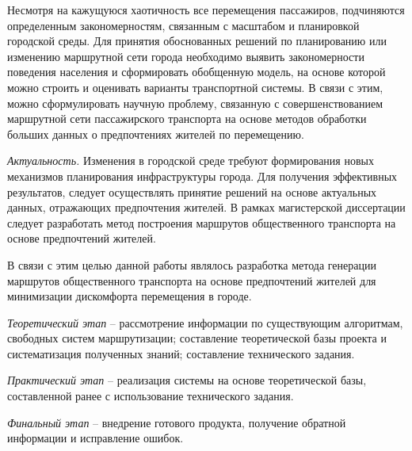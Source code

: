 Несмотря на кажущуюся хаотичность все перемещения пассажиров, подчиняются определенным закономерностям, 
связанным с масштабом и планировкой городской среды. Для принятия обоснованных решений по планированию или 
изменению маршрутной сети города необходимо выявить закономерности поведения населения и сформировать 
обобщенную модель, на основе которой можно строить и оценивать варианты транспортной системы. В связи с 
этим, можно сформулировать научную проблему, связанную с совершенствованием маршрутной сети пассажирского 
транспорта  на основе методов обработки больших данных о предпочтениях жителей по перемещению. 

\emph{Актуальность.} Изменения в городской среде требуют формирования новых механизмов 
планирования инфраструктуры города. Для получения эффективных результатов, следует осуществлять 
принятие решений на основе актуальных данных, отражающих предпочтения жителей. В рамках 
магистерской диссертации следует разработать метод построения маршрутов общественного транспорта 
на основе предпочтений жителей.


В связи с этим целью данной работы являлось разработка метода генерации маршрутов общественного 
транспорта на основе предпочтений жителей для минимизации дискомфорта перемещения в городе.

\emph{Теоретический этап} -- рассмотрение информации по существующим алгоритмам, свободных систем 
маршрутизации; составление теоретической базы проекта и систематизация полученных знаний; 
составление технического задания. 

\emph{Практический этап} -- реализация системы на основе теоретической базы, составленной ранее с 
использование технического задания.

\emph{Финальный этап} -- внедрение готового продукта, получение обратной информации и исправление 
ошибок.

